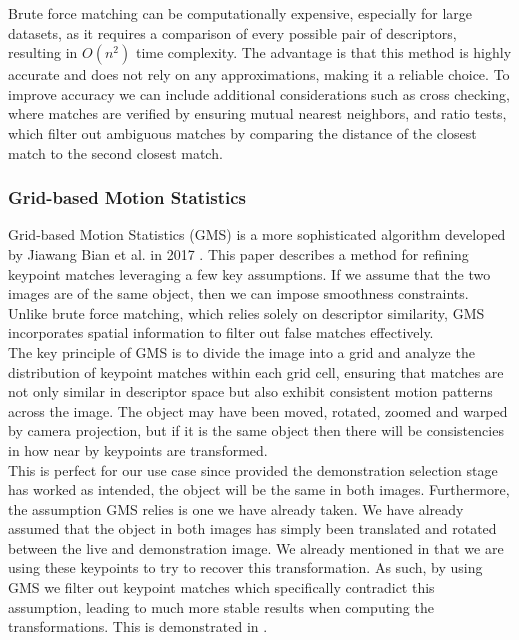 Brute force matching can be computationally expensive, especially for large datasets, as it requires a comparison of every possible pair of descriptors, resulting in $O(n^2)$ time complexity. The advantage is that this method is highly accurate and does not rely on any approximations, making it a reliable choice. To improve accuracy we can include additional considerations such as cross checking, where matches are verified by ensuring mutual nearest neighbors, and ratio tests, which filter out ambiguous matches by comparing the distance of the closest match to the second closest match.

\subsubsection{Grid-based Motion Statistics}
Grid-based Motion Statistics (GMS) is a more sophisticated algorithm developed by Jiawang Bian et al. in 2017 \cite{GMS}. This paper describes a method for refining keypoint matches leveraging a few key assumptions. If we assume that the two images are of the same object, then we can impose smoothness constraints. Unlike brute force matching, which relies solely on descriptor similarity, GMS incorporates spatial information to filter out false matches effectively.\\

The key principle of GMS is to divide the image into a grid and analyze the distribution of keypoint matches within each grid cell, ensuring that matches are not only similar in descriptor space but also exhibit consistent motion patterns across the image. The object may have been moved, rotated, zoomed and warped by camera projection, but if it is the same object then there will be consistencies in how near by keypoints are transformed.\\

This is perfect for our use case since provided the demonstration selection stage has worked as intended, the object will be the same in both images. Furthermore, the assumption GMS relies is one we have already taken. We have already assumed that the object in both images has simply been translated and rotated between the live and demonstration image. We already mentioned in  that we are using these keypoints to try to recover this transformation. As such, by using GMS we filter out keypoint matches which specifically contradict this assumption, leading to much more stable results when computing the transformations. This is demonstrated in .

